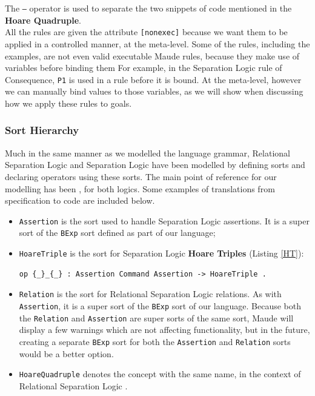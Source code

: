 \documentclass[12pt,a4paper]{article}
\begin{document}
{The \texttt{---} operator is used to separate the two snippets of code mentioned in the \textbf{Hoare Quadruple}.
\\

All the rules are given the attribute \texttt{[nonexec]} because we want them to be applied in a controlled manner, at the meta-level. Some of the rules, including the examples, are not even valid executable Maude rules, because they make use of variables before binding them For example, in the Separation Logic rule of \textsf{Consequence}, \texttt{P1} is used in a rule before it is bound. At the meta-level, however we can manually bind values to those variables, as we will show when discussing how we apply these rules to goals.
\subsubsection{Sort Hierarchy}
Much in the same manner as we modelled the language grammar, Relational Separation Logic and Separation Logic have been modelled by defining sorts and declaring operators using these sorts. The main point of reference for our modelling has been \cite{relational}, for both logics. Some examples of translations from specification to code are included below.
\begin{itemize}
	\item \texttt{Assertion} is the sort used to handle Separation Logic assertions. It is a super sort of the \texttt{BExp} sort defined as part of our language;
	\item \texttt{HoareTriple} is the sort for Separation Logic \textbf{Hoare Triples} (Listing \ref{HT}):
	\begin{lstlisting}[caption=Hoare Triple constructor operator,label=HT]
op {_}_{_} : Assertion Command Assertion -> HoareTriple .\end{lstlisting}
	\item \texttt{Relation} is the sort for Relational Separation Logic relations. As with \texttt{Assertion}, it is a super sort of the \texttt{BExp} sort of our language. Because both the \texttt{Relation} and \texttt{Assertion} are super sorts of the same sort, Maude will display a few warnings which are not affecting functionality, but in the future, creating a separate \texttt{BExp} sort for both the \texttt{Assertion} and \texttt{Relation} sorts would be a better option.
	\item \texttt{HoareQuadruple} denotes the concept with the same name, in the context of Relational Separation Logic .\\

\end{itemize}}
\end{document}
